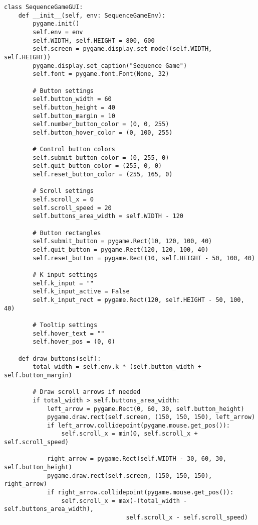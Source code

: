 \begin{lstlisting}
class SequenceGameGUI:
    def __init__(self, env: SequenceGameEnv):
        pygame.init()
        self.env = env
        self.WIDTH, self.HEIGHT = 800, 600
        self.screen = pygame.display.set_mode((self.WIDTH, self.HEIGHT))
        pygame.display.set_caption("Sequence Game")
        self.font = pygame.font.Font(None, 32)
        
        # Button settings
        self.button_width = 60
        self.button_height = 40
        self.button_margin = 10
        self.number_button_color = (0, 0, 255)
        self.button_hover_color = (0, 100, 255)
        
        # Control button colors
        self.submit_button_color = (0, 255, 0)
        self.quit_button_color = (255, 0, 0)
        self.reset_button_color = (255, 165, 0)
        
        # Scroll settings
        self.scroll_x = 0
        self.scroll_speed = 20
        self.buttons_area_width = self.WIDTH - 120
        
        # Button rectangles
        self.submit_button = pygame.Rect(10, 120, 100, 40)
        self.quit_button = pygame.Rect(120, 120, 100, 40)
        self.reset_button = pygame.Rect(10, self.HEIGHT - 50, 100, 40)
        
        # K input settings
        self.k_input = ""
        self.k_input_active = False
        self.k_input_rect = pygame.Rect(120, self.HEIGHT - 50, 100, 40)
        
        # Tooltip settings
        self.hover_text = ""
        self.hover_pos = (0, 0)

    def draw_buttons(self):
        total_width = self.env.k * (self.button_width + self.button_margin)
        
        # Draw scroll arrows if needed
        if total_width > self.buttons_area_width:
            left_arrow = pygame.Rect(0, 60, 30, self.button_height)
            pygame.draw.rect(self.screen, (150, 150, 150), left_arrow)
            if left_arrow.collidepoint(pygame.mouse.get_pos()):
                self.scroll_x = min(0, self.scroll_x + self.scroll_speed)
            
            right_arrow = pygame.Rect(self.WIDTH - 30, 60, 30, self.button_height)
            pygame.draw.rect(self.screen, (150, 150, 150), right_arrow)
            if right_arrow.collidepoint(pygame.mouse.get_pos()):
                self.scroll_x = max(-(total_width - self.buttons_area_width), 
                                  self.scroll_x - self.scroll_speed)
        

\end{lstlisting}
